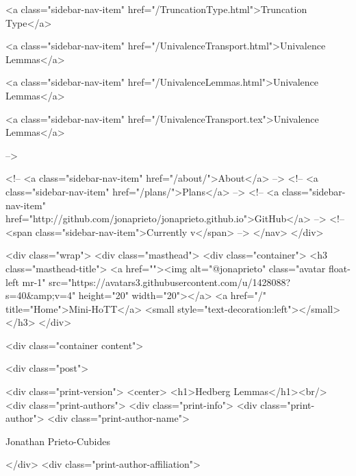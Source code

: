       
    
      
        
          <a class="sidebar-nav-item" href="/TruncationType.html">Truncation Type</a>
        
      
    
      
        
          <a class="sidebar-nav-item" href="/UnivalenceTransport.html">Univalence Lemmas</a>
        
      
    
      
        
          <a class="sidebar-nav-item" href="/UnivalenceLemmas.html">Univalence Lemmas</a>
        
      
    
      
        
          <a class="sidebar-nav-item" href="/UnivalenceTransport.tex">Univalence Lemmas</a>
        
      
     -->

    <!-- <a class="sidebar-nav-item" href="/about/">About</a> -->
    <!-- <a class="sidebar-nav-item" href="/plans/">Plans</a> -->
    <!-- <a class="sidebar-nav-item" href="http://github.com/jonaprieto/jonaprieto.github.io">GitHub</a> -->
    <!-- <span class="sidebar-nav-item">Currently v</span> -->
  </nav>
</div>

    <div class="wrap">
      <div class="masthead">
        <div class="container">
          <h3 class="masthead-title">
            <a href=""><img alt="@jonaprieto" class="avatar float-left mr-1" src="https://avatars3.githubusercontent.com/u/1428088?s=40&amp;v=4" height="20" width="20"></a>
            <a href="/" title="Home">Mini-HoTT</a>
            <small style="text-decoration:left"></small>
          </h3>
        </div>
      
      <div class="container content">
        







<div class="post">

  <div class="print-version">
    <center>
      <h1>Hedberg Lemmas</h1><br/>
        <div class="print-authors">
          <div class="print-info">
            <div class="print-author">
              <div class="print-author-name">
                
                  Jonathan Prieto-Cubides
                
              </div>
              <div class="print-author-affiliation">
                
